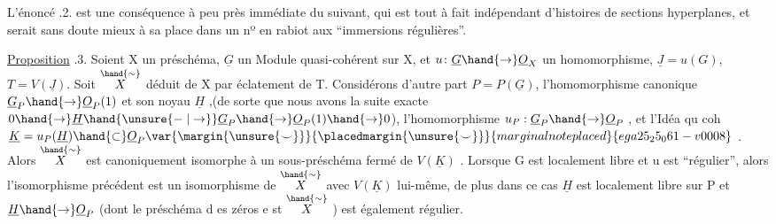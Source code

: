 
L'énoncé .2. est une conséquence à peu près immédiate du suivant,
qui est tout à fait indépendant d'histoires de sections hyperplanes, et
serait sans doute mieux à sa place dans  un nº en rabiot aux
``immersions régulières''.

\uline{Proposition} .3. Soient X un préschéma,  $\underline{G}$ un Module quasi-cohérent
sur X, et $u\colon \underline{G}\hand{\to}\underline{O}_X$ un homomorphisme, $\underline{J} = u(G)$, $T=V(\underline{J})$. Soit
$\overset{\hand{\sim}}{X}$ déduit de X par éclatement de T. Considérons d'autre part
$P = P(\underline{G})$, l'homomorphisme canonique $\underline{G}_P\hand{\to}\underline{O}_P(1)$ et son noyau
$\underline{H}$ ,(de sorte que nous avons la suite exacte $0\hand{\to}\underline{H}\hand{\unsure{\relbar|\to}}\underline{G}_P\hand{\to}\underline{O}_P(1)\hand{\to}0$),
l'homomorphisme $u_P : \underline{G}_P \hand{\to} \underline{O}_P$ , et l'Idéa qu coh $\underline{K} = u_P(\underline{H})\hand{\subset}\underline{O}_P\var{\margin{\unsure{\smile}}}{\placedmargin{\unsure{\smile}}}{marginal note placed}{ega25_25_061-v0008}$ .
Alors $\overset{\hand{\sim}}{X}$ est canoniquement isomorphe à un sous-préschéma fermé de
$V(\underline{K})$ . Lorsque G est localement libre et u est ``régulier'', alors
l'isomorphisme précédent est un isomorphisme de $\overset{\hand{\sim}}{X}$ avec $V(\underline{K})$ lui-même,
de plus dans ce cas $\underline{H}$ est localement libre sur P et  $\underline{H}\hand{\to}\underline{O}_P$
(dont le préschéma d es zéros e st $\overset{\hand{\sim}}{X}$ ) est également régulier.

